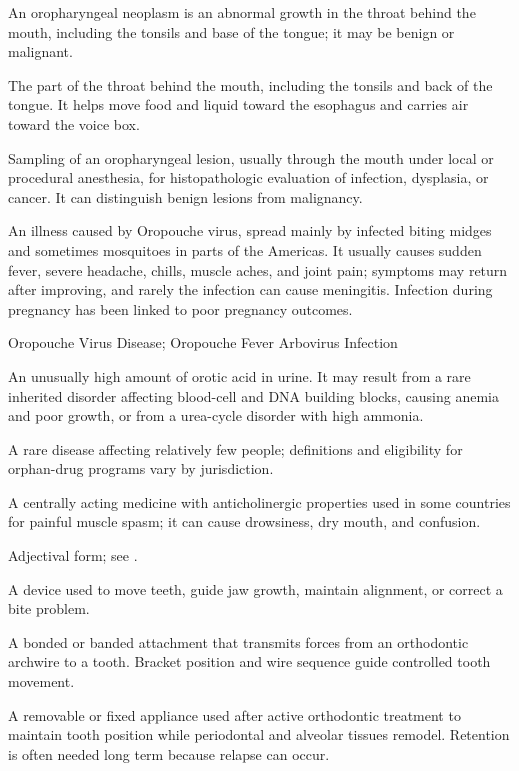  An oropharyngeal neoplasm is an abnormal growth in the throat behind the mouth, including the tonsils and base of the tongue; it may be benign or malignant.

 The part of the throat behind the mouth, including the tonsils and back of the tongue. It helps move food and liquid toward the esophagus and carries air toward the voice box.

 Sampling of an oropharyngeal lesion, usually through the mouth under local or procedural anesthesia, for histopathologic evaluation of infection, dysplasia, or cancer. It can distinguish benign lesions from malignancy.

 An illness caused by Oropouche virus, spread mainly by infected biting midges and sometimes mosquitoes in parts of the Americas. It usually causes sudden fever, severe headache, chills, muscle aches, and joint pain; symptoms may return after improving, and rarely the infection can cause meningitis. Infection during pregnancy has been linked to poor pregnancy outcomes.

\synonyms
Oropouche Virus Disease; Oropouche Fever Arbovirus Infection

 An unusually high amount of orotic acid in urine. It may result from a rare inherited disorder affecting blood-cell and DNA building blocks, causing anemia and poor growth, or from a urea-cycle disorder with high ammonia.

 A rare disease affecting relatively few people; definitions and eligibility for orphan-drug programs vary by jurisdiction.

 A centrally acting medicine with anticholinergic properties used in some countries for painful muscle spasm; it can cause drowsiness, dry mouth, and confusion.

 Adjectival form; see .

 A device used to move teeth, guide jaw growth, maintain alignment, or correct a bite problem.

 A bonded or banded attachment that transmits forces from an orthodontic archwire to a
tooth. Bracket position and wire sequence guide controlled tooth movement.

 A removable or fixed appliance used after active orthodontic treatment to maintain tooth
position while periodontal and alveolar tissues remodel. Retention is often needed long
term because relapse can occur.


